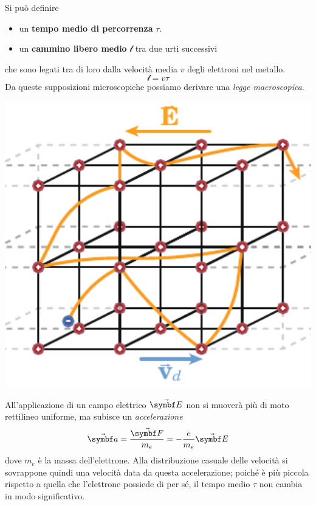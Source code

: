 Si può definire
\begin{itemize}
	\item un \textbf{tempo medio di percorrenza} $\tau$.
	\item un \textbf{cammino libero medio} $\mathcal{l}$ tra due urti successivi
\end{itemize}
che sono legati tra di loro dalla velocità media $v$ degli elettroni nel metallo.
\begin{equation}
	\mathcal{l}=v\tau
\end{equation}
Da queste supposizioni microscopiche possiamo derivare una \textit{legge macroscopica}.\\
\begin{minipage}{0.38\textwidth}
	\begin{center}
		\includegraphics[width=1\textwidth]{images/chp5/chp5reticolocristallinoacc.pdf}
	\end{center}
\end{minipage}\hspace{5pt}
\begin{minipage}{0.61\textwidth}
	 All'applicazione di un campo elettrico $\vba{E}$ non si muoverà più di moto rettilineo uniforme, ma subisce un \textit{accelerazione}
	\begin{equation*}
		\vba{a}=\frac{\vba{F}}{m_{e}}=-\frac{e}{m_{e}}\vba{E}
	\end{equation*}
	dove $m_e$ è la massa dell'elettrone. Alla distribuzione casuale delle velocità si sovrappone quindi una velocità data da questa accelerazione; poiché è più piccola rispetto a quella che l'elettrone possiede di per sé, il tempo medio $\tau$ non cambia in modo significativo.
\end{minipage}\\
